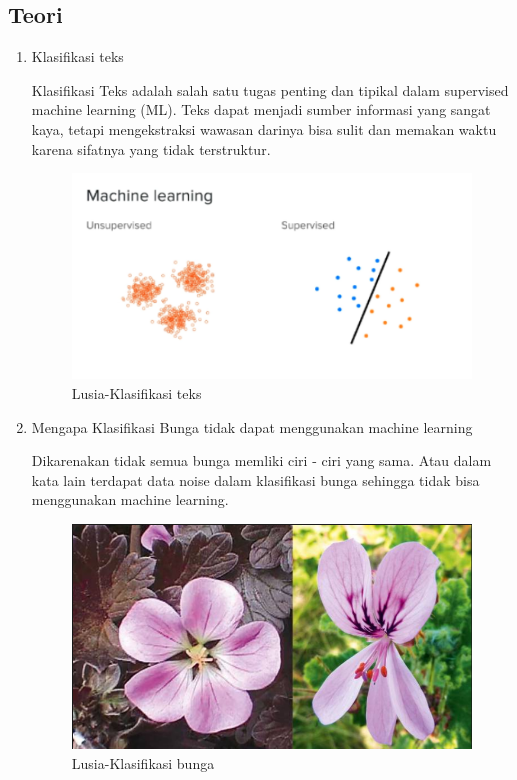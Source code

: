 \subsection{Teori}
\begin{enumerate}
\item Klasifikasi teks
	\par Klasifikasi Teks adalah salah satu tugas penting dan tipikal dalam supervised machine learning (ML). Teks dapat menjadi sumber informasi yang sangat kaya, tetapi mengekstraksi wawasan darinya bisa sulit dan memakan waktu karena sifatnya yang tidak terstruktur.
	\begin{figure}[ht]
		\centering
		\includegraphics[scale=0.5]{figures/AFS/k1.png}
		\caption{Lusia-Klasifikasi teks}
		\label{contoh}
	\end{figure}
	
\item Mengapa Klasifikasi Bunga tidak dapat menggunakan machine learning
	\par Dikarenakan tidak semua bunga memliki ciri - ciri yang sama. Atau dalam kata lain terdapat data noise dalam klasifikasi bunga sehingga tidak bisa menggunakan machine learning.
	\begin{figure}[ht]
		\centering
		\includegraphics[scale=0.5]{figures/AFS/k2.png}
		\caption{Lusia-Klasifikasi bunga}
		\label{contoh}
	\end{figure}


\end{enumerate}
